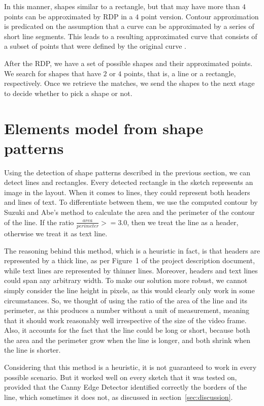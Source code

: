 \documentclass[]{IEEEtran}
\begin{document}
  In this manner, shapes similar to a rectangle, but that may have more than $4$ points can be approximated by RDP in a $4$ point version. Contour approximation is predicated on the assumption that a curve can be approximated by a series of short line segments. This leads to a resulting approximated curve that consists of a subset of points that were defined by the original curve \cite{shape_detection}.
  
  After the RDP, we have a set of possible shapes and their approximated points. We search for shapes that have $2$ or $4$ points, that is, a line or a rectangle, respectively. Once we retrieve the matches, we send the shapes to the next stage to decide whether to pick a shape or not.
  
  \section{Elements model from shape patterns}
  Using the detection of shape patterns described in the previous section, we can detect lines and rectangles. Every detected rectangle in the sketch represents an image in the layout. When it comes to lines, they could represent both headers and lines of text. To differentiate between them, we use the computed contour by Suzuki and Abe's method to calculate the area and the perimeter of the contour of the line. If the ratio $\frac{area}{perimeter} >= 3.0$, then we treat the line as a header, otherwise we treat it as text line.
  
  The reasoning behind this method, which is a heuristic in fact, is that headers are represented by a thick line, as per Figure~1 of the project description document, while text lines are represented by thinner lines. Moreover, headers and text lines could span any arbitrary width. To make our solution more robust, we cannot simply consider the line height in pixels, as this would clearly only work in some circumstances. So, we thought of using the ratio of the area of the line and its perimeter, as this produces a number without a unit of measurement, meaning that it should work reasonably well irrespective of the size of the video frame. Also, it accounts for the fact that the line could be long or short, because both the area and the perimeter grow when the line is longer, and both shrink when the line is shorter.

  Considering that this method is a heuristic, it is not guaranteed to work in every possible scenario. But it worked well on every sketch that it was tested on, provided that the Canny Edge Detector identified correctly the borders of the line, which sometimes it does not, as discussed in section~\ref{sec:discussion}.
\end{document}
